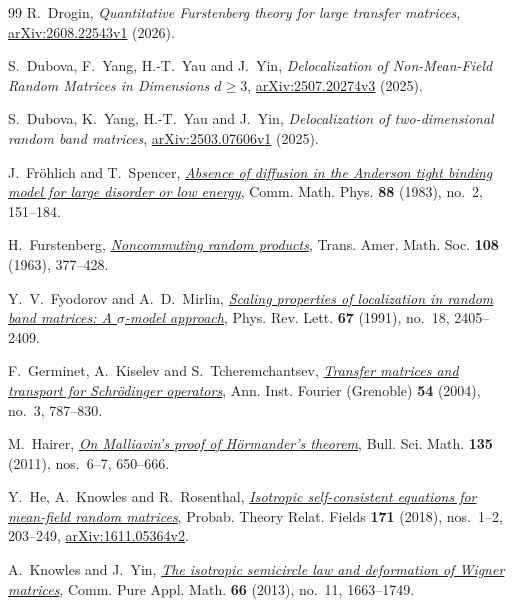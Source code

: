 \documentclass[11pt]{article}
\numberwithin{equation}{section}
\theoremstyle{remark}
\begin{document}
\begin{thebibliography}{99}
R.~Drogin, \emph{Quantitative Furstenberg theory for large transfer matrices},
\href{https://arxiv.org/abs/2608.22543v1}{arXiv:2608.22543v1} (2026).

S.~Dubova, F.~Yang, H.-T.~Yau and J.~Yin,
\emph{Delocalization of Non-Mean-Field Random Matrices in Dimensions
$d\ge3$},
\href{https://arxiv.org/abs/2507.20274v3}{arXiv:2507.20274v3} (2025).

S.~Dubova, K.~Yang, H.-T.~Yau and J.~Yin,
\emph{Delocalization of two-dimensional random band matrices},
\href{https://arxiv.org/abs/2503.07606v1}{arXiv:2503.07606v1} (2025).

J.~Fr\"ohlich and T.~Spencer,
\href{https://doi.org/10.1007/BF01209475}{\emph{Absence of diffusion in the Anderson tight binding model for
large disorder or low energy}},
Comm. Math. Phys. \textbf{88} (1983), no.~2, 151--184.

H.~Furstenberg, \href{https://doi.org/10.1090/S0002-9947-1963-0163345-0}{\emph{Noncommuting random products}},
Trans. Amer. Math. Soc. \textbf{108} (1963), 377--428.

Y.~V.~Fyodorov and A.~D.~Mirlin,
\href{https://doi.org/10.1103/PhysRevLett.67.2405}{\emph{Scaling properties of localization in random band matrices:
A $\sigma$-model approach}},
Phys. Rev. Lett. \textbf{67} (1991), no.~18, 2405--2409.

F.~Germinet, A.~Kiselev and S.~Tcheremchantsev,
\href{https://doi.org/10.5802/aif.2034}{\emph{Transfer matrices and transport for Schr\"odinger operators}},
Ann. Inst. Fourier (Grenoble) \textbf{54} (2004), no.~3, 787--830.

M.~Hairer, \href{https://doi.org/10.1016/j.bulsci.2011.07.007}{\emph{On Malliavin's proof of H\"ormander's theorem}},
Bull. Sci. Math. \textbf{135} (2011), nos.~6--7, 650--666.

Y.~He, A.~Knowles and R.~Rosenthal,
\href{https://doi.org/10.1007/s00440-017-0776-y}{\emph{Isotropic self-consistent equations for mean-field random matrices}},
Probab. Theory Relat. Fields \textbf{171} (2018), nos.~1--2, 203--249,
\href{https://arxiv.org/abs/1611.05364v2}{arXiv:1611.05364v2}.

A.~Knowles and J.~Yin,
\href{https://doi.org/10.1002/cpa.21450}{\emph{The isotropic semicircle law and deformation of Wigner matrices}},
Comm. Pure Appl. Math. \textbf{66} (2013), no.~11, 1663--1749.


\end{thebibliography}
\end{document}
